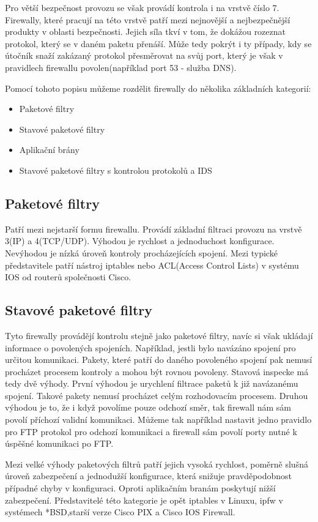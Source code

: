 \documentclass[11pt,twoside,a4paper]{article}
\begin{document}
Pro větší bezpečnost provozu se však provádí kontrola i na vrstvě číslo 7. Firewally, které pracují na této vrstvě patří mezi nejnovější a nejbezpečnější produkty v oblasti bezpečnosti. Jejich síla tkví v tom, že dokážou rozeznat protokol, který se v daném paketu přenáší. Může tedy pokrýt i ty případy, kdy se útočník snaží zakázaný protokol přesměrovat na svůj port, který je však v pravidlech firewallu povolen(například port 53 - služba DNS).

Pomocí tohoto popisu můžeme rozdělit firewally do několika základních kategorií:
\begin{itemize}
	\item Paketové filtry
	\item Stavové paketové filtry
	\item Aplikační brány
	\item Stavové paketové filtry s kontrolou protokolů a IDS
\end{itemize} 

\subsection{Paketové filtry}
Patří mezi nejstarší formu firewallu. Provádí základní filtraci provozu na vrstvě 3(IP) a 4(TCP/UDP). Výhodou je rychlost a jednoduchost konfigurace. Nevýhodou je nízká úroveň kontroly procházejících spojení. Mezi typické představitele patří nástroj iptables nebo ACL(Access Control Lists) v systému IOS od routerů společnosti Cisco.

\subsection{Stavové paketové filtry}
Tyto firewally provádějí kontrolu stejně jako paketové filtry, navíc si však ukládají informace o povolených spojeních. Například, jestli bylo navázáno spojení pro určitou komunikaci. Pakety, které patří do daného povoleného spojení pak nemusí procházet procesem kontroly a mohou být rovnou povoleny. Stavová inspecke má tedy dvě výhody. První výhodou je urychlení filtrace paketů k již navázanému spojení. Takové pakety nemusí procházet celým rozhodovacím procesem. Druhou výhodou je to, že i když povolíme pouze odchozí směr, tak firewall nám sám povolí příchozí validní komunikaci. Můžeme tak například nastavit jedno pravidlo pro FTP protokol pro odchozí komunikaci a firewall sám povolí porty nutné k úspěšné komunikaci po FTP.

Mezi velké výhody paketových filtrů patří jejich vysoká rychlost, poměrně slušná úroveň zabezpečení a jednodužší konfigurace, která snižuje pravděpodobnost případné chyby v konfiguraci. Oproti aplikačním branám poskytují nižší zabezpečení. Představitelé této kategorie je opět iptables v Linuxu, ipfw v systémech *BSD,starší verze Cisco PIX a Cisco IOS Firewall.
\end{document}
